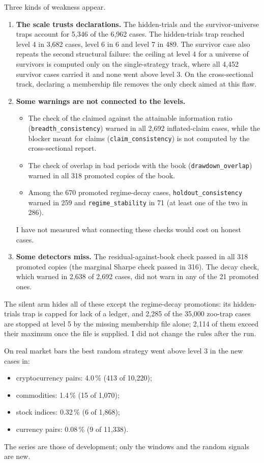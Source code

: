 \documentclass[11pt]{article}
\newcommand{\chk}[1]{\texttt{#1}}
\begin{document}
Three kinds of weakness appear.
\begin{enumerate}
\item \textbf{The scale trusts declarations.} The hidden-trials and the survivor-universe traps account for 5,346 of the
6,962 cases. The hidden-trials trap reached level 4 in 3,682 cases, level 6 in 6 and level 7 in 489. The survivor case
also repeats the second structural failure: the ceiling at level 4 for a universe of survivors is computed only on the
single-strategy track, where all 4,452 survivor cases carried it and none went above level 3. On the cross-sectional
track, declaring a membership file removes the only check aimed at this flaw.
\item \textbf{Some warnings are not connected to the levels.}
\begin{itemize}
\item The check of the claimed against the attainable information ratio (\chk{breadth\_consistency}) warned in all
2,692 inflated-claim cases, while the blocker meant for claims (\chk{claim\_consistency}) is not computed by the
cross-sectional report.
\item The check of overlap in bad periods with the book (\chk{drawdown\_overlap}) warned in all 318 promoted copies of
the book.
\item Among the 670 promoted regime-decay cases, \chk{holdout\_consistency} warned in 259 and \chk{regime\_stability}
in 71 (at least one of the two in 286).
\end{itemize}
I have not measured what connecting these checks would cost on honest cases.
\item \textbf{Some detectors miss.} The residual-against-book check passed in all 318 promoted copies (the marginal
Sharpe check passed in 316). The decay check, which warned in 2,638 of 2,692 cases, did not warn in any of the 21
promoted ones.
\end{enumerate}
The silent arm hides all of these except the regime-decay promotions: its hidden-trials trap is capped for lack of a
ledger, and 2,285 of the 35,000 zoo-trap cases are stopped at level 5 by the missing membership file alone; 2,114 of
them exceed their maximum once the file is supplied. I did not change the rules after the run.

On real market bars the best random strategy went above level 3 in the new cases in:
\begin{itemize}
\item cryptocurrency pairs: 4.0\,\% (413 of 10,220);
\item commodities: 1.4\,\% (15 of 1,070);
\item stock indices: 0.32\,\% (6 of 1,868);
\item currency pairs: 0.08\,\% (9 of 11,338).
\end{itemize}
The series are those of development; only the windows and the random signals are new.
\end{document}
